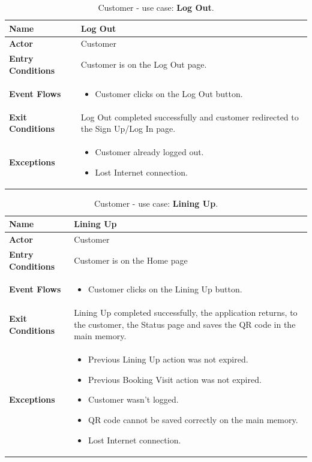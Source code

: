 \begin{table}[hbt!]
\centering
\begin{tabular}{| m{} | m{} |} 
	\hline
	\textbf{Name} & Log Out \\ 
	\hline
	\textbf{Actor} & Customer \\ 
	\hline
	\textbf{Entry Conditions} & Customer is on the Log Out page. \\ 
	\hline
	\textbf{Event Flows} &
	\begin{itemize}
	\item Customer clicks on the Log Out button.
	\end{itemize} \\ 
	\hline
	\textbf{Exit Conditions} & Log Out completed successfully and customer redirected to the Sign Up/Log In page. \\ 
	\hline
	\textbf{Exceptions} &
	\begin{itemize}
	\item Customer already logged out.
	\item Lost Internet connection.
	\end{itemize} \\ 
	\hline
\end{tabular}
\caption{Customer - use case: \textbf{Log Out}.}
\label{tableLogIn}
\end{table}

\begin{table}[hbt!]
\centering
\begin{tabular}{| m{} | m{} |} 
	\hline
	\textbf{Name} & Lining Up \\ 
	\hline
	\textbf{Actor} & Customer \\ 
	\hline
	\textbf{Entry Conditions} & Customer is on the Home page \\ 
	\hline
	\textbf{Event Flows} &
	\begin{itemize}
	\item Customer clicks on the Lining Up button.
	\end{itemize} \\ 
	\hline
	\textbf{Exit Conditions} & Lining Up completed successfully, the application returns, to the customer, the Status page and saves the QR code in the main memory. \\ 
	\hline
	\textbf{Exceptions} &
	\begin{itemize}
	\item Previous Lining Up action was not expired.
	\item Previous Booking Visit action was not expired.
	\item Customer wasn't logged.
	\item QR code cannot be saved correctly on the main memory.
	\item Lost Internet connection.
	\end{itemize} \\ 
	\hline
\end{tabular}
\caption{Customer - use case: \textbf{Lining Up}.}
\label{tableLogIn}
\end{table}

